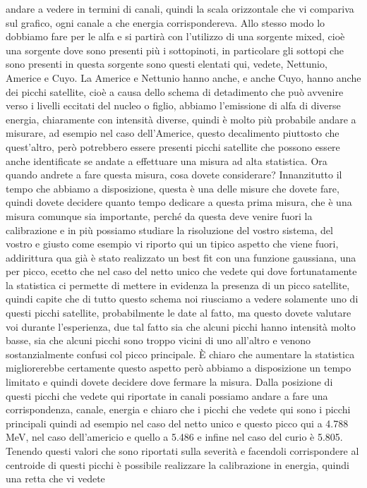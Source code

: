 andare a vedere in termini di canali, quindi la scala orizzontale che vi compariva sul grafico, ogni canale a che energia corrispondereva. Allo stesso modo lo dobbiamo fare per le alfa e si partirà con l'utilizzo di una sorgente mixed, cioè una sorgente dove sono presenti più i sottopinoti, in particolare gli sottopi che sono presenti in questa sorgente sono questi elentati qui, vedete, Nettunio, Americe e Cuyo. La Americe e Nettunio hanno anche, e anche Cuyo, hanno anche dei picchi satellite, cioè a causa dello schema di detadimento che può avvenire verso i livelli eccitati del nucleo o figlio, abbiamo l'emissione di alfa di diverse energia, chiaramente con intensità diverse, quindi è molto più probabile andare a misurare, ad esempio nel caso dell'Americe, questo decalimento piuttosto che quest'altro, però potrebbero essere presenti picchi satellite che possono essere anche identificate se andate a effettuare una misura ad alta statistica. Ora quando andrete a fare questa misura, cosa dovete considerare? Innanzitutto il tempo che abbiamo a disposizione, questa è una delle misure che dovete fare, quindi dovete decidere quanto tempo dedicare a questa prima misura, che è una misura comunque sia importante, perché da questa deve venire fuori la calibrazione e in più possiamo studiare la risoluzione del vostro sistema, del vostro e giusto come esempio vi riporto qui un tipico aspetto che viene fuori, addirittura qua già è stato realizzato un best fit con una funzione gaussiana, una per picco, ecetto che nel caso del netto unico che vedete qui dove fortunatamente la statistica ci permette di mettere in evidenza la presenza di un picco satellite, quindi capite che di tutto questo schema noi riusciamo a vedere solamente uno di questi picchi satellite, probabilmente le date al fatto, ma questo dovete valutare voi durante l'esperienza, due tal fatto sia che alcuni picchi hanno intensità molto basse, sia che alcuni picchi sono troppo vicini di uno all'altro e venono sostanzialmente confusi col picco principale. È chiaro che aumentare la statistica migliorerebbe certamente questo aspetto però abbiamo a disposizione un tempo limitato e quindi dovete decidere dove fermare la misura. Dalla posizione di questi picchi che vedete qui riportate in canali possiamo andare a fare una corrispondenza, canale, energia e chiaro che i picchi che vedete qui sono i picchi principali quindi ad esempio nel caso del netto unico e questo picco qui a 4.788 MeV, nel caso dell'americio e quello a 5.486 e infine nel caso del curio è 5.805. Tenendo questi valori che sono riportati sulla severità e facendoli corrispondere al centroide di questi picchi è possibile realizzare la calibrazione in energia, quindi una retta che vi vedete 

